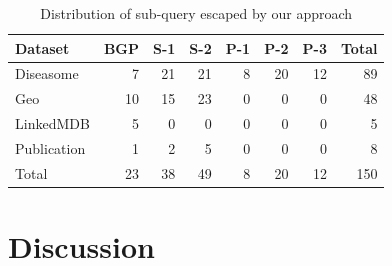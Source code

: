 \documentclass{sig-alternate}  %
\begin{document}
\begin{table}
\centering
\begin{tabular}{lrrrrrrr}
\hline
Dataset		&BGP 	&S-1&S-2&P-1&P-2&P-3&Total \\\hline
Diseasome				&7		&21	&21	&8	&20	&12	&89\\
Geo 	&10		&15	&23	&0	&0	&0	&48\\
LinkedMDB				&5		&0	&0	&0	&0	&0	&5\\
Publication			&1		&2	&5	&0	&0	&0	&8\\\hline
Total 					&23		&38	&49	&8	&20	&12	&150 \\\hline
\end{tabular}
\caption{Distribution of sub-query escaped by our approach}
\label{tab:escaped}
\end{table}
\section{Discussion}




%
%
\end{document}
